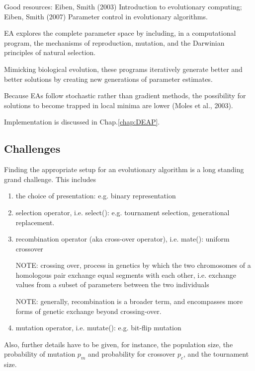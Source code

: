 Good resources: Eiben, Smith (2003) Introduction to evolutionary computing;
Eiben, Smith (2007) Parameter control in evolutionary algorithms.



EA explores the complete parameter space by including, in a computational
program, the mechanisms of reproduction, mutation, and the Darwinian principles
of natural selection.


Mimicking biological evolution, these programs iteratively generate better and
better solutions by creating new generations of parameter estimates.

Because EAs follow stochastic rather than gradient methods, the possibility for
solutions to become trapped in local minima are lower (Moles et al., 2003).

Implementation is discussed in Chap.\ref{chap:DEAP}.

\subsection{Challenges}

Finding the appropriate setup for an evolutionary algorithm is a long standing
grand challenge. This includes
\begin{enumerate}

  \item the choice of presentation: e.g. binary representation

  \item selection operator, i.e. select(): e.g. tournament selection,
  generational replacement.

  \item recombination operator (aka cross-over operator), i.e. mate(): uniform
  crossover

NOTE: crossing over, process in genetics by which the two chromosomes of a
homologous pair exchange equal segments with each other, i.e. exchange values
from a subset of parameters between the two individuals

NOTE: generally, recombination is a broader term, and encompasses more forms of
genetic exchange beyond crossing-over.

  \item mutation operator, i.e. mutate(): e.g. bit-flip mutation
\end{enumerate}

Also, further details have to be given, for instance, the population size, the
probability of mutation $p_m$ and probability for crossover $p_c$, and the
tournament size.

